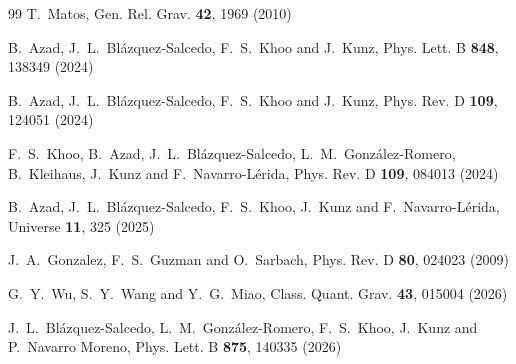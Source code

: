\documentclass[11pt,a4paper]{article}
\begin{document}
\begin{thebibliography}{99}
T.~Matos,
Gen. Rel. Grav. \textbf{42}, 1969 (2010)

B.~Azad, J.~L.~Bl\'azquez-Salcedo, F.~S.~Khoo and J.~Kunz,
Phys. Lett. B \textbf{848}, 138349 (2024)

B.~Azad, J.~L.~Bl{\'a}zquez-Salcedo, F.~S.~Khoo and J.~Kunz,
Phys. Rev. D \textbf{109}, 124051 (2024)

F.~S.~Khoo, B.~Azad, J.~L.~Bl\'azquez-Salcedo, L.~M.~Gonz\'alez-Romero, B.~Kleihaus, J.~Kunz and F.~Navarro-L\'erida,
Phys. Rev. D \textbf{109}, 084013 (2024)

B.~Azad, J.~L.~Bl{\'a}zquez-Salcedo, F.~S.~Khoo, J.~Kunz and F.~Navarro-L{\'e}rida,
Universe \textbf{11}, 325 (2025)

J.~A.~Gonzalez, F.~S.~Guzman and O.~Sarbach,
Phys. Rev. D \textbf{80}, 024023 (2009)

G.~Y.~Wu, S.~Y.~Wang and Y.~G.~Miao,
Class. Quant. Grav. \textbf{43}, 015004 (2026)

J.~L.~Bl{\'a}zquez-Salcedo, L.~M.~Gonz{\'a}lez-Romero, F.~S.~Khoo, J.~Kunz and P.~Navarro Moreno,
Phys. Lett. B \textbf{875}, 140335 (2026)


\end{thebibliography}
\end{document}
